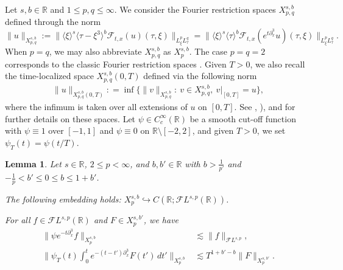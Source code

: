 \documentclass[a4paper,
11pt,  reqno]{amsart}
\newcommand{\jap}[1]{\langle #1 \rangle}
\newcommand{\5}{\textup{V}}
\newcommand{\noi}{\noindent}
\newcommand{\FL}{\mathcal{F} L}
\newcommand{\les}{\lesssim}
\newcommand{\F}{\mathcal{F}}
\newcommand{\dx}{\partial_x}
\newtheorem{lemma}[theorem]{Lemma}
\theoremstyle{remark}
\newcommand{\R}{\mathbb{R}}
\newcommand{\jb}[1]
{\langle #1 \rangle}
\numberwithin{equation}{section}
\numberwithin{theorem}{section}
\begin{document}
		Let $s,b\in \R$ and $1\le p,q \le \infty$. We consider the Fourier restriction spaces $X^{s,b}_{p,q}$ defined through the norm
		\begin{equation}\label{Xsb}
			\| u \|_{X^{s,b}_{p,q}} := \| \jap{\xi}^s \jap{\tau-\xi^3}^b \F_{t,x}(u) (\tau, \xi) \|_{L^p_\xi L^q_\tau}
            =
            \| \jb{\xi}^s \jb{\tau}^b \F_{t,x}(e^{t \dx^3} u ) (\tau, \xi) \|_{L^p_\xi L^q_\tau}.
		\end{equation}
When $p=q$, we may also abbreviate $X^{s,b}_{p,q}$ as $X^{s,b}_p$.
		The case $p=q=2$ corresponds to the classic Fourier restriction spaces \cite{bourg1, bourg2}.
        Given $T>0$, we also recall the time-localized space $X^{s, b}_{p,q} (0,T)$ defined via the following norm
        \begin{align}
            \| u\|_{X^{s, b}_{p,q}(0,T)} : = \inf
            \big\{
            \| v\|_{X^{s, b}_{p,q}} : \ v\in X^{s,b}_{p,q}, \ v\vert_{[0,T]} = u
            \big\},
        \end{align}
        where the infimum is taken over all extensions of $u$ on $[0,T]$. See \cite[Chapter 2.6]{tao_book}, \cite[Chapter 7.4]{linares_ponce_book}), and  \cite{HerrGrunrock_FL} for further details on these spaces.
        Let  $\psi\in C_c^\infty(\R)$ be a smooth cut-off function with $\psi\equiv 1$ over $[-1,1]$ and $\psi\equiv 0$ on $\R\setminus [-2,2]$, and given $T>0$, we set $\psi_T(t)=\psi(t/T)$.



\begin{lemma}
\label{lem:linear_estimates_qfinite}
			Let $s\in\R$, $2\le p <\infty$, and $b,b'\in\R$ with $b > \frac{1}{p'}$ and $-\frac1p<b' \le 0 \le b \le 1+b'$.


			\noi{\rm(i)} The following embedding holds: $X^{s,b}_{p} \hookrightarrow C(\R;\FL^{s,p}(\R))$.

			\smallskip
			\noi{\rm(ii)} For all $f \in \FL^{s,p}(\R)$ and $F \in X^{s, b'}_p$, we have
			\begin{align}
				\label{lin1_gh}
				\| \psi e^{-t\dx^3} f \|_{X^{s,b}_{p}} &\les \| f \|_{\FL^{s,p}},
                \\
				\bigg\| \psi_T (t) \int_0^t e^{-(t-t')\dx^3 } F(t') \, dt' \bigg\|_{X^{s,b}_{p} }
                &
                \les T^{1+b'-b} \| F \|_{X^{s,b'}_{p}}.
                \label{lin2a_gh}
			\end{align}

		\end{lemma}
\end{document}
